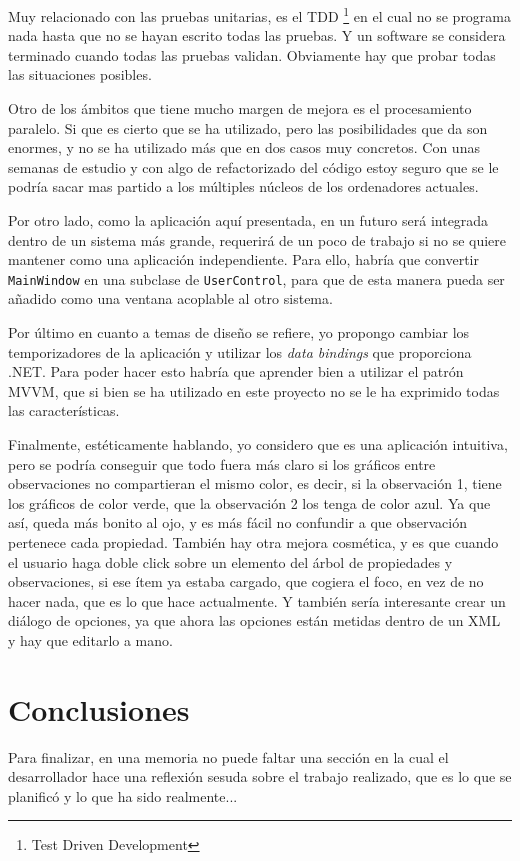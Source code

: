 Muy relacionado con las pruebas unitarias, es el TDD \footnote{Test Driven Development} en el cual no se programa
nada hasta que no se hayan escrito todas las pruebas. Y un software se considera terminado cuando todas las pruebas
validan. Obviamente hay que probar todas las situaciones posibles.

Otro de los \'ambitos que tiene mucho margen de mejora es el procesamiento paralelo. Si que es cierto que se ha
utilizado, pero las posibilidades que da son enormes, y no se ha utilizado m\'as que en dos casos
muy concretos. Con unas semanas de estudio y con algo de refactorizado del c\'odigo estoy seguro
que se le podr\'ia sacar mas partido a los m\'ultiples n\'ucleos de los ordenadores actuales.

Por otro lado, como la aplicaci\'on aqu\'i presentada, en un futuro ser\'a integrada dentro de un sistema m\'as grande,
requerir\'a de un poco de trabajo si no se quiere mantener como una aplicaci\'on independiente.
Para ello, habr\'ia que convertir \texttt{MainWindow} en una subclase de \texttt{UserControl}, para
que de esta manera pueda ser a\~nadido como una ventana acoplable al otro sistema.

Por \'ultimo en cuanto a temas de dise\~no se refiere, yo propongo cambiar los temporizadores de la
aplicaci\'on y utilizar los \emph{data bindings} que proporciona .NET. Para poder hacer esto
habr\'ia que aprender bien a utilizar el patr\'on MVVM, que si bien se ha utilizado en este proyecto
no se le ha exprimido todas las caracter\'isticas.

Finalmente, est\'eticamente hablando, yo considero que es una aplicaci\'on intuitiva, pero se podr\'ia conseguir
que todo fuera m\'as claro si los gr\'aficos entre observaciones no compartieran el mismo color,
es decir, si la observaci\'on 1, tiene los gr\'aficos de color verde, que la observaci\'on 2 los tenga de color azul.
Ya que as\'i, queda m\'as bonito al ojo, y es m\'as f\'acil no confundir a que observaci\'on pertenece cada propiedad.
Tambi\'en hay otra mejora cosm\'etica, y es que cuando el usuario haga doble click sobre un elemento del \'arbol
de propiedades y observaciones, si ese \'item ya estaba cargado, que cogiera el foco, en vez de no hacer nada, que 
es lo que hace actualmente. Y tambi\'en ser\'ia interesante crear un di\'alogo de opciones, ya que ahora las
opciones est\'an metidas dentro de un XML y hay que editarlo a mano.

\section{Conclusiones}
Para finalizar, en una memoria no puede faltar una secci\'on en la cual el desarrollador
hace una reflexi\'on sesuda sobre el trabajo realizado, que es lo que se planific\'o
y lo que ha sido realmente...

